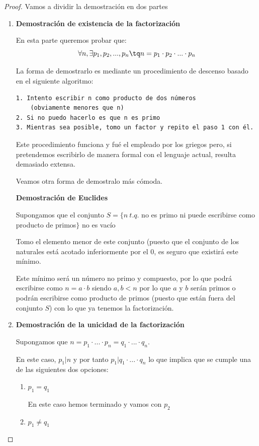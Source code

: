 \documentclass{apuntes}
\begin{document}
\begin{proof}
Vamos a dividir la demostración en dos partes

\begin{enumerate}
\item \textbf{Demostración de existencia de la factorización}

En esta parte queremos probar que:
\[\forall n , \exists p_1,p_2,...,p_n \tq n=p_1\cdot p_2 \cdot ... \cdot p_n\]

La forma de demostrarlo es mediante un procedimiento de descenso basado en el siguiente algoritmo:
\begin{verbatim}
1. Intento escribir n como producto de dos números 
    (obviamente menores que n)
2. Si no puedo hacerlo es que n es primo
3. Mientras sea posible, tomo un factor y repito el paso 1 con él. 
\end{verbatim}

Este procedimiento funciona y fué el empleado por los griegos pero, si pretendemos escribirlo de manera formal con el lenguaje actual, resulta demasiado extensa.

Veamos otra forma de demostralo más cómoda.

\textbf{Demostración de Euclides}

Supongamos que el conjunto $S=\{n \ t.q.$ no es primo ni puede escribirse como producto de primos$\}$ no es vacío

Tomo el elemento menor de este conjunto (puesto que el conjunto de los naturales está acotado inferiormente por el 0, es seguro que existirá este mínimo.

Este mínimo será un número no primo y compuesto, por lo que podrá escribirse como $n=a\cdot b $ siendo $a,b < n$ por lo que $a$ y $b$ serán primos o podrán escribirse como producto de primos (puesto que están fuera del conjunto $S$) con lo que ya tenemos la factorización.

\item \textbf{Demostración de la unicidad de la factorización}

Supongamos que $n=p_1\cdot...\cdot p_n=q_1\cdot ... \cdot q_n$. 

En este caso, $p_1|n$ y por tanto $p_1|q_1\cdot ... \cdot q_n$ lo que implica que se cumple una de las siguientes dos opciones:
\begin{enumerate}
\item $p_1=q_1$

En este caso hemos terminado y vamos con $p_2$

\item $p_1\neq q_1$


\end{enumerate}
\end{enumerate}
\end{proof}
\end{document}
